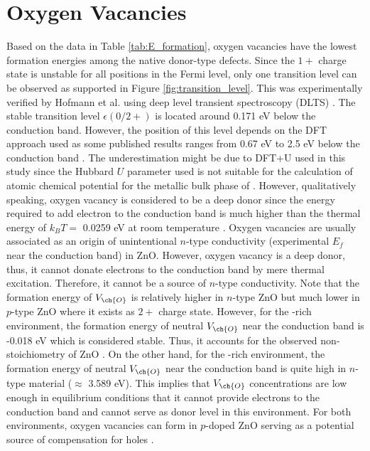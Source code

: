 \section{Oxygen Vacancies}
Based on the data in Table \ref{tab:E_formation}, oxygen vacancies have the lowest formation energies among the native donor-type defects. Since the $1+$ charge state is unstable for all positions in the Fermi level, only one transition level can be observed as supported in Figure \ref{fig:transition_level}. This was experimentally verified by Hofmann et al. using deep level transient spectroscopy (DLTS) \citep{Hofmann2007}.
The stable transition level $\epsilon(0/2+)$ is located around 0.171 eV below the conduction band. However, the position of this level depends on the DFT approach used as some published results ranges from 0.67 eV to 2.5 eV below the conduction band \citep{Lany2010, Oba2008, Paudel2008}. The underestimation might be due to DFT+U used in this study since the Hubbard $U$ parameter used is not suitable for the calculation of atomic chemical potential for the metallic bulk phase of  \citep{Lany2010}. However, qualitatively speaking, oxygen vacancy is considered to be a deep donor since the energy required to add electron to the conduction band is much higher than the thermal energy of $k_B T = $ 0.0259 eV at room temperature \citep{Freysoldt2014}. Oxygen vacancies are usually associated as an origin of unintentional $n$-type conductivity (experimental $E_f$ near the conduction band) in ZnO. However, oxygen vacancy is a deep donor, thus, it cannot donate electrons to the conduction band by mere thermal excitation. Therefore, it cannot be a source of $n$-type conductivity. Note that the formation energy of $V_{\ch{O}}$ is relatively higher in  $n$-type ZnO  but much lower in $p$-type ZnO where it exists as $2+$ charge state. However, for the -rich environment, the formation energy of neutral $V_{\ch{O}}$  near the conduction band is -0.018 eV which is considered stable. Thus, it accounts for the observed non-stoichiometry of ZnO  \citep{Oba2011}. On the other hand, for the -rich environment, the formation energy of neutral $V_{\ch{O}}$  near the conduction band is quite high in $n$-type material ($\approx$ 3.589 eV). This implies that  $V_{\ch{O}}$ concentrations are low enough in equilibrium conditions that it cannot provide electrons to the conduction band and cannot serve as donor level in this environment. For both environments, oxygen vacancies can form in $p$-doped ZnO serving as a potential source of compensation for holes \citep{Janotti2007}.


